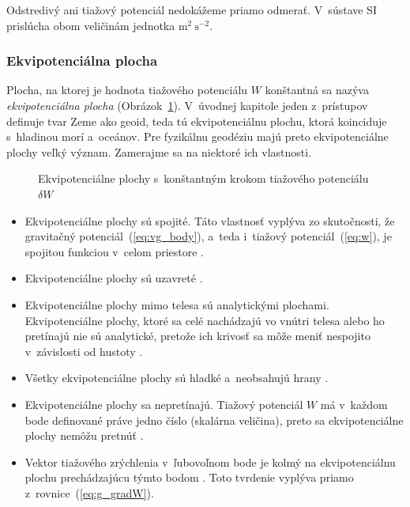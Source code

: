\documentclass[a4paper,12pt]{book}
\begin{document}
Odstredivý ani tiažový potenciál nedokážeme priamo odmerať.  V~sústave SI 
prislúcha obom veličinám jednotka $\mathrm{m}^2 \ \mathrm{s}^{-2}$.

\subsubsection{Ekvipotenciálna plocha}
\label{sec:equipotential_surface}

Plocha, na ktorej je hodnota tiažového potenciálu $W$ konštantná sa nazýva
\emph{ekvipotenciálna plocha} (Obrázok~\ref{fig:equipotential_surfaces}).
V~úvodnej kapitole jeden z~prístupov definuje tvar Zeme ako geoid, teda tú
ekvipotenciálnu plochu, ktorá koinciduje s~hladinou morí a~oceánov.  Pre
fyzikálnu geodéziu majú preto ekvipotenciálne plochy veľký význam.  Zamerajme
sa na niektoré ich vlastnosti.

\begin{figure}
\centering

\caption{Ekvipotenciálne plochy s~konštantným krokom tiažového potenciálu
$\delta W$}
\label{fig:equipotential_surfaces}
\end{figure}

\begin{itemize}
\item Ekvipotenciálne plochy sú spojité.  Táto vlastnosť vyplýva zo
skutočnosti, že gravitačný potenciál~(\ref{eq:vg_body}), a~teda i~tiažový
potenciál~(\ref{eq:w}), je spojitou funkciou v~celom priestore
\parencite{Janak2006}.

\item Ekvipotenciálne plochy sú uzavreté \parencite{VanicekGeodesy}.

\item Ekvipotenciálne plochy mimo telesa sú analytickými plochami.
Ekvipotenciálne plochy, ktoré sa celé nachádzajú vo vnútri telesa alebo ho
pretínajú nie sú analytické, pretože ich krivosť sa môže meniť nespojito
v~závislosti od hustoty \parencite{MoritzPhysicalGeodesy}.

\item Všetky ekvipotenciálne plochy sú hladké a~neobsahujú hrany
\parencite{MoritzPhysicalGeodesy}.

\item Ekvipotenciálne plochy sa nepretínajú.  Tiažový potenciál $W$ má v~každom
bode definované práve jedno číslo (skalárna veličina), preto sa ekvipotenciálne
plochy nemôžu pretnúť \parencite{MacMillan1930}.

\item Vektor tiažového zrýchlenia v~ľubovoľnom bode je kolmý na ekvipotenciálnu
plochu prechádzajúcu týmto bodom \parencite{MoritzPhysicalGeodesy}.  Toto 
tvrdenie vyplýva priamo z~rovnice~(\ref{eq:g_gradW}).
\end{itemize}
\end{document}
